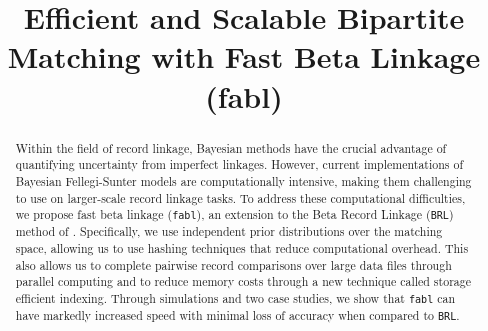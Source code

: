 \documentclass[ba]{imsart}
\begin{document}
\linenumbers
\begin{frontmatter}
\title{Efficient and Scalable Bipartite Matching with Fast Beta Linkage  (fabl)}


\begin{abstract}
Within the field of record linkage, Bayesian methods have the crucial advantage of quantifying uncertainty from imperfect linkages. However, current implementations of Bayesian Fellegi-Sunter models are computationally intensive, making them challenging to use on larger-scale record linkage tasks. To address these computational difficulties, we propose fast beta linkage (\texttt{fabl}), an extension to the Beta Record Linkage (\texttt{BRL}) method of \cite{sadinle_bayesian_2017}. Specifically, we use independent prior distributions over the matching space, allowing us to use hashing techniques that reduce computational overhead. This also allows us to complete pairwise record comparisons over large data files through parallel computing and to reduce memory costs through a new technique called storage efficient indexing. Through simulations and two case studies, we show that \texttt{fabl} can have markedly increased speed with minimal loss of accuracy when compared to \texttt{BRL}.
\end{abstract}

\begin{keyword}%
\end{keyword}

\end{frontmatter}
\end{document}
